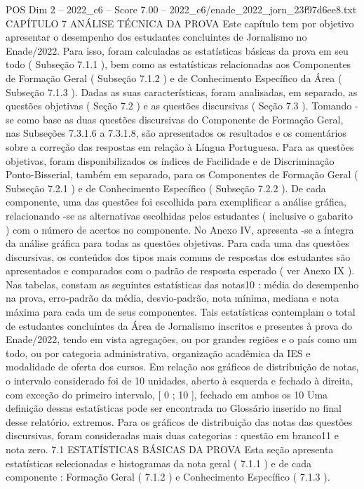 \begin{textsample}{POS Dim 2 – 2022\_c6 – Score 7.00 – 2022\_c6/enade\_2022\_jorn\_23f97d6ee8.txt}  \label{ex:f2_pos_136}
CAPÍTULO 7 ANÁLISE TÉCNICA DA PROVA Este capítulo tem por objetivo apresentar o desempenho dos estudantes concluintes de Jornalismo no Enade/2022.
Para isso, foram calculadas as estatísticas básicas da prova em seu todo ( Subseção 7.1.1 ), bem como as estatísticas relacionadas aos Componentes de Formação Geral ( Subseção 7.1.2 ) e de Conhecimento Específico da Área ( Subseção 7.1.3 ).
Dadas as suas características, foram analisadas, em separado, as questões objetivas ( Seção 7.2 ) e as questões discursivas ( Seção 7.3 ).
Tomando -se como base as duas questões discursivas do Componente de Formação Geral, nas Subseções 7.3.1.6 a 7.3.1.8, são apresentados os resultados e os comentários sobre a correção das respostas em relação à Língua Portuguesa.
Para as questões objetivas, foram disponibilizados os índices de Facilidade e de Discriminação Ponto-Bisserial, também em separado, para os Componentes de Formação Geral ( Subseção 7.2.1 ) e de Conhecimento Específico ( Subseção 7.2.2 ).
De cada componente, uma das questões foi escolhida para exemplificar a análise gráfica, relacionando -se as alternativas escolhidas pelos estudantes ( inclusive o gabarito ) com o número de acertos no componente.
No Anexo IV, apresenta -se a íntegra da análise gráfica para todas as questões objetivas.
Para cada uma das questões discursivas, os conteúdos dos tipos mais comuns de respostas dos estudantes são apresentados e comparados com o padrão de resposta esperado ( ver Anexo IX ).
Nas tabelas, constam as seguintes estatísticas das notas10 : média do desempenho na prova, erro-padrão da média, desvio-padrão, nota mínima, mediana e nota máxima para cada um de seus componentes.
Tais estatísticas contemplam o total de estudantes concluintes da Área de Jornalismo inscritos e presentes à prova do Enade/2022, tendo em vista agregações, ou por grandes regiões e o país como um todo, ou por categoria administrativa, organização acadêmica da IES e modalidade de oferta dos cursos.
Em relação aos gráficos de distribuição de notas, o intervalo considerado foi de 10 unidades, aberto à esquerda e fechado à direita, com exceção do primeiro intervalo, [ 0 ; 10 ], fechado em ambos os 10 Uma definição dessas estatísticas pode ser encontrada no Glossário inserido no final desse relatório. extremos.
Para os gráficos de distribuição das notas das questões discursivas, foram consideradas mais duas categorias : questão em branco11 e nota zero. 7.1 ESTATÍSTICAS BÁSICAS DA PROVA Esta seção apresenta estatísticas selecionadas e histogramas da nota geral ( 7.1.1 ) e de cada componente : Formação Geral ( 7.1.2 ) e Conhecimento Específico ( 7.1.3 ).

\end{textsample}
